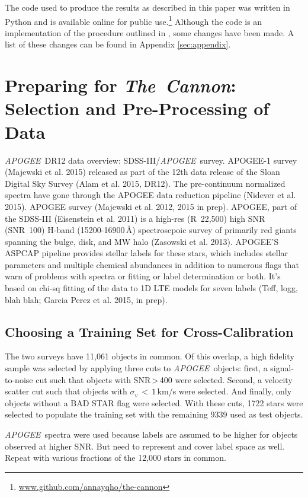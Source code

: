 \documentclass[12pt, preprint]{aastex}
\newcommand{\tc}{\textsl{The~Cannon}}
\newcommand{\apogee}{\textsl{APOGEE}}
\begin{document}
The code used to produce the results as described in this paper was written in
Python and is available online for public 
use.\footnote{\url{www.github.com/annayqho/the-cannon}}
Although the code is an implementation of the procedure outlined in 
\citep{ness2015}, some changes have been made. A list of these changes 
can be found in Appendix \ref{sec:appendix}.

\section{Preparing for \tc: Selection and Pre-Processing of Data}

\apogee\ DR12 data overview: SDSS-III/\apogee\ survey. APOGEE-1 survey 
(Majewski et al. 2015) released as part of the 12th data release of the Sloan
Digital Sky Survey (Alam et al. 2015, DR12). The pre-continuum normalized
spectra have gone through the APOGEE data reduction pipeline 
(Nidever et al. 2015). APOGEE survey (Majewski et al. 2012, 2015 in prep). 
APOGEE, part of the SDSS-III (Eisenstein et al. 2011) is a high-res
(R~22,500) high SNR (SNR~100) H-band (15200-16900\,$\mbox{\AA}$) spectroscpoic
survey of primarily red giants spanning the bulge, disk, and MW halo 
(Zasowski et al. 2013). APOGEE'S ASPCAP pipeline provides stellar labels for
these stars, which includes stellar parameters and multiple chemical 
abundances in addition to numerous flags that warn of problems with spectra
or fitting or label determination or both. It's based on chi-sq fitting of
the data to 1D LTE models for seven labels (Teff, logg, blah blah; Garcia 
Perez et al. 2015, in prep). 
\subsection{Choosing a Training Set for Cross-Calibration}

The two surveys have 11,061 objects in common. Of this overlap, a high 
fidelity sample was selected by applying three cuts to \apogee\ objects: 
first, a signal-to-noise cut such that objects with SNR\,\textgreater\,400 
were selected. Second, a velocity scatter cut such that objects with 
$\sigma_v\, < \,1$\,km/s were selected. And finally, only objects
without a BAD STAR flag were selected. With these cuts, 1722 stars were
selected to populate the training set with the remaining 9339 used as test
objects. 

\apogee\ spectra
were used because labels are assumed to be higher for objects observed at
higher SNR.  
But need to represent and cover label space as well. Repeat with 
various fractions of the 12,000 stars in common.
\end{document}
